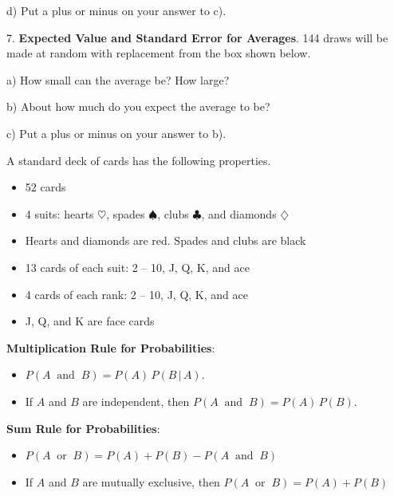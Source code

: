 \documentclass[10pt]{article}
\begin{document}
\hspace{10pt} d)  Put a plus or minus on your answer to c).
\vspace{.6in}


7. \textbf{Expected Value and Standard Error for Averages}. 
144 draws will be made at random with replacement
from the box shown below.\vspace{-20pt}
\begin{center}
\end{center}
\hspace{10pt} a)  How small can the average be?  How large?
\vspace{.5in}

\hspace{10pt} b) About how much do you expect the average to be?
\vspace{.6in}

\hspace{10pt} c)  Put a plus or minus on your answer to b).
\vspace{.6in}

\vfill
\eject

 A standard deck of cards has the following properties.
\begin{itemize}
\item 52 cards
\item 4 suits:  hearts $\heartsuit$, spades $\spadesuit$, clubs $\clubsuit$,
  and diamonds $\diamondsuit$
\item Hearts and diamonds are red.  Spades and clubs are black
\item 13 cards of each suit:  2 -- 10, J, Q, K, and ace
\item 4 cards of each rank:  2 -- 10, J, Q, K, and ace
\item J, Q, and K are face cards
\end{itemize}

\textbf{Multiplication Rule for Probabilities}:  
\begin{itemize}
\item $P(A\;\;\mbox{and}\;\;B)=P(A)\,P(B\,\vert\,A)$.
\item If $A$ and $B$ are independent, then $P(A\;\;\mbox{and}\;\;B)=P(A)\,P(B)$.
\end{itemize}
\textbf{Sum Rule for Probabilities}:
\begin{itemize}
\item $P(A\;\;\mbox{or}\;\;B)=P(A)+P(B) - P(A\;\;\mbox{and}\;\;B)$
\item If $A$ and $B$ are mutually exclusive, then $P(A\;\;\mbox{or}\;\;B)=P(A)+P(B)$
\end{itemize}  
\bigskip
\end{document}
